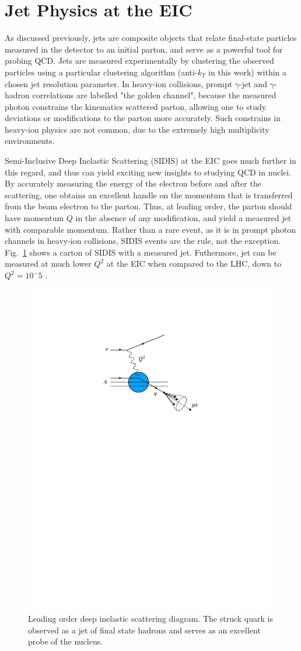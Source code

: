 \section{Jet Physics at the EIC}
As discussed previously, jets are composite objects that relate final-state particles measured in the detector to an initial parton, and serve as a powerful tool for probing QCD. Jets are measured experimentally by clustering the observed particles using a particular clustering algorithm (anti-$k_T$ \cite{Cacciari:2008gp} in this work) within a chosen jet resolution parameter. In heavy-ion collisions, prompt $\gamma$-jet and $\gamma$-hadron correlations are labelled "the golden channel", because the measured photon constrains the kinematics scattered parton, allowing one to study deviations or modifications to the parton more accurately. Such constrains in heavy-ion physics are not common, due to the extremely high multiplicity environments. 

Semi-Inclusive Deep Inelastic Scattering (SIDIS) at the EIC goes much further in this regard, and thus can yield exciting new insights to studying QCD in nuclei. By accurately measuring the energy of the electron before and  after the scattering, one obtains an excellent handle on the momentum that is transferred from the beam electron to the parton. Thus, at leading order, the parton should have momentum $Q$ in the absence of any modification, and yield a measured jet with comparable momentum. Rather than a rare event, as it is in prompt photon channels in heavy-ion collisions, SIDIS events are the rule, not the exception. Fig.~\ref{fig:eic_dis} shows a carton of SIDIS with a measured jet. Futhermore, jet can be measured at much lower $Q^2$ at the EIC when compared to the LHC, down to  $Q^2 = 10^-5$ \cite{Khalek2021}.

\begin{figure}[htb]
\centering
	\includegraphics[width = 0.5 \textwidth]{EIC_Jets/LO_DIS_Diagrgram_jet.pdf}
	\caption{Leading order deep inelastic scattering diagram. The struck quark is observed as a jet of final state hadrons and serves as an excellent probe of the nucleus.}
  \label{fig:eic_dis}
\end{figure}

